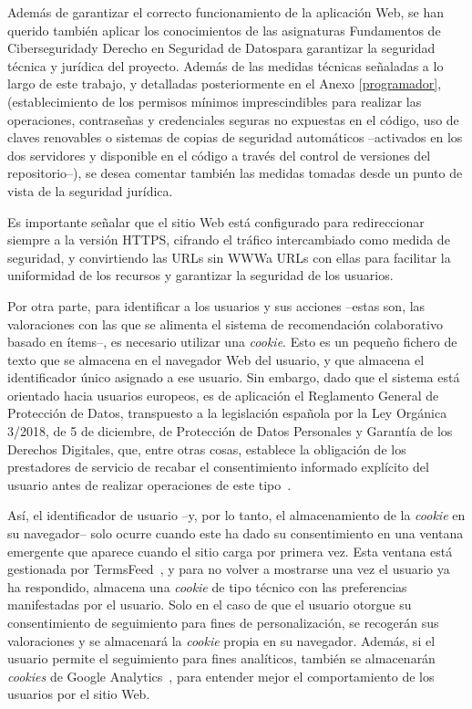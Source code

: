 Además de garantizar el correcto funcionamiento de la aplicación Web, se han querido también aplicar los conocimientos de las asignaturas \guillemotleft Fundamentos de Ciberseguridad\guillemotright\space y \guillemotleft Derecho en Seguridad de Datos\guillemotright\space para garantizar la seguridad técnica y jurídica del proyecto. Además de las medidas técnicas señaladas a lo largo de este trabajo, y detalladas posteriormente en el Anexo \ref{programador}, (establecimiento de los permisos mínimos imprescindibles para realizar las operaciones, contraseñas y credenciales seguras no expuestas en el código, uso de claves renovables o sistemas de copias de seguridad automáticos –activados en los dos servidores y disponible en el código a través del control de versiones del repositorio–), se desea comentar también las medidas tomadas desde un punto de vista de la seguridad jurídica.

Es importante señalar que el sitio Web está configurado para redireccionar siempre a la versión HTTPS, cifrando el tráfico intercambiado como medida de seguridad, y convirtiendo las URLs sin \guillemotleft WWW\guillemotright\space a URLs con ellas para facilitar la uniformidad de los recursos y garantizar la seguridad de los usuarios.

Por otra parte, para identificar a los usuarios y sus acciones –estas son, las valoraciones con las que se alimenta el sistema de recomendación colaborativo basado en ítems–, es necesario utilizar una \textit{cookie}. Esto es un pequeño fichero de texto que se almacena en el navegador Web del usuario, y que almacena el identificador único asignado a ese usuario. Sin embargo, dado que el sistema está orientado hacia usuarios europeos, es de aplicación el Reglamento General de Protección de Datos, transpuesto a la legislación española por la Ley Orgánica 3/2018, de 5 de diciembre, de Protección de Datos Personales y Garantía de los Derechos Digitales, que, entre otras cosas, establece la obligación de los prestadores de servicio de recabar el consentimiento informado explícito del usuario antes de realizar operaciones de este tipo~\cite{GDPR_ESP}.

Así, el identificador de usuario –y, por lo tanto, el almacenamiento de la \textit{cookie} en su navegador– solo ocurre cuando este ha dado su consentimiento en una ventana emergente que aparece cuando el sitio carga por primera vez. Esta ventana está gestionada por TermsFeed~\cite{TermsFeed}, y para no volver a mostrarse una vez el usuario ya ha respondido, almacena una \textit{cookie} de tipo técnico con las preferencias manifestadas por el usuario. Solo en el caso de que el usuario otorgue su consentimiento de seguimiento para fines de personalización, se recogerán sus valoraciones y se almacenará la \textit{cookie} propia en su navegador. Además, si el usuario permite el seguimiento para fines analíticos, también se almacenarán \textit{cookies} de Google Analytics~\cite{analytics}, para entender mejor el comportamiento de los usuarios por el sitio Web.

